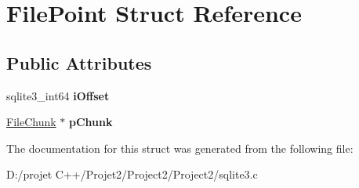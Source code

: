 \hypertarget{struct_file_point}{}\section{File\+Point Struct Reference}
\label{struct_file_point}
\subsection*{Public Attributes}
\begin{DoxyCompactItemize}
\item 
\mbox{\label{struct_file_point_a00a345e479cd37ebeb9e6ed475eb4112}} 
sqlite3\+\_\+int64 {\bfseries i\+Offset}
\item 
\mbox{\label{struct_file_point_aa17216d9d2559f14a00a2c72a8959298}} 
\mbox{\hyperlink{struct_file_chunk}{File\+Chunk}} $\ast$ {\bfseries p\+Chunk}
\end{DoxyCompactItemize}


The documentation for this struct was generated from the following file\+:\begin{DoxyCompactItemize}
\item 
D\+:/projet C++/\+Projet2/\+Project2/\+Project2/sqlite3.\+c\end{DoxyCompactItemize}
